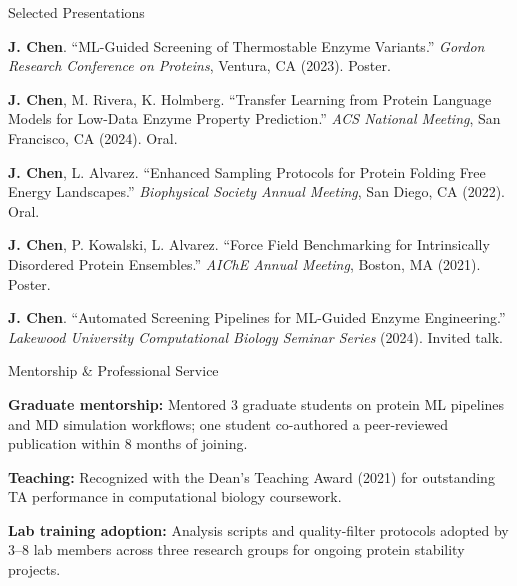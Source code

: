\documentclass{cv}
\begin{document}
\begin{rSection2}{Selected Presentations}
\item \textbf{J. Chen}. ``ML-Guided Screening of Thermostable Enzyme Variants.'' \textit{Gordon Research Conference on Proteins}, Ventura, CA (2023). Poster.
\item \textbf{J. Chen}, M. Rivera, K. Holmberg. ``Transfer Learning from Protein Language Models for Low-Data Enzyme Property Prediction.'' \textit{ACS National Meeting}, San Francisco, CA (2024). Oral.
\item \textbf{J. Chen}, L. Alvarez. ``Enhanced Sampling Protocols for Protein Folding Free Energy Landscapes.'' \textit{Biophysical Society Annual Meeting}, San Diego, CA (2022). Oral.
\item \textbf{J. Chen}, P. Kowalski, L. Alvarez. ``Force Field Benchmarking for Intrinsically Disordered Protein Ensembles.'' \textit{AIChE Annual Meeting}, Boston, MA (2021). Poster.
\item \textbf{J. Chen}. ``Automated Screening Pipelines for ML-Guided Enzyme Engineering.'' \textit{Lakewood University Computational Biology Seminar Series} (2024). Invited talk.
\end{rSection2}

\begin{rSection2}{Mentorship \& Professional Service}
\item \textbf{Graduate mentorship:} Mentored 3 graduate students on protein ML pipelines and MD simulation workflows; one student co-authored a peer-reviewed publication within 8 months of joining.
\item \textbf{Teaching:} Recognized with the Dean's Teaching Award (2021) for outstanding TA performance in computational biology coursework.
\item \textbf{Lab training adoption:} Analysis scripts and quality-filter protocols adopted by 3--8 lab members across three research groups for ongoing protein stability projects.
\end{rSection2}
\end{document}
